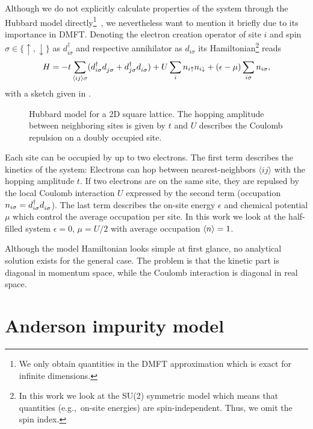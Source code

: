 Although we do not explicitly calculate properties of the system through the
Hubbard model directly\footnote{
    We only obtain quantities in the DMFT approximation which is exact for infinite dimensions.
}~\cite{Hubbard1997},
we nevertheless want to mention it briefly due to its importance in DMFT\@.
Denoting the electron creation operator of site $i$ and spin $\sigma\in\{\uparrow,\downarrow\}$
as $d^\dag_{i\sigma}$ and respective annihilator as $d_{i\sigma}$ its Hamiltonian\footnote{
    In this work we look at the SU(2) symmetric model %
    which means that quantities (e.g.,\ on-site energies) are spin-independent.
    Thus, we omit the spin index.
}
reads
\begin{equation}
    H
    =
    -t\sum_{\langle i j\rangle\sigma}
    (d^\dag_{i\sigma} d^{\pdag}_{j\sigma} + d^\dag_{j\sigma} d^{\pdag}_{i\sigma})
    +
    U\sum_i n_{i\uparrow} n_{i\downarrow}
    +
    (\epsilon - \mu)\sum_{i\sigma} n_{i\sigma},
    \label{eq:H-Hubbard}
\end{equation}
with a sketch given in .
\begin{figure}[ht]
    \centering
    
    \caption{
        Hubbard model for a 2D square lattice.
        The hopping amplitude between neighboring sites is given by $t$
        and $U$ describes the Coulomb repulsion on a doubly occupied site.
    }%
    \label{fig:hubbard-model}
\end{figure}
Each site can be occupied by up to two electrons.
The first term describes the kinetics of the system:
Electrons can hop between nearest-neighbors $\langle i j\rangle$
with the hopping amplitude $t$.
If two electrons are on the same site, they are repulsed by the local Coulomb interaction $U$
expressed by the second term (occupation $n_{i\sigma} = d^\dag_{i\sigma} d^{\pdag}_{i\sigma}$).
The last term describes the on-site energy $\epsilon$ and
chemical potential $\mu$ which control the average occupation per site.
In this work we look at the half-filled system $\epsilon=0$,  $\mu=U/2$
with average occupation $\langle n\rangle = 1$.


Although the model Hamiltonian looks simple at first glance,
no analytical solution exists for the general case.
The problem is that the kinetic part is diagonal in momentum space,
while the Coulomb interaction is diagonal in real space.

\section{Anderson impurity model}

